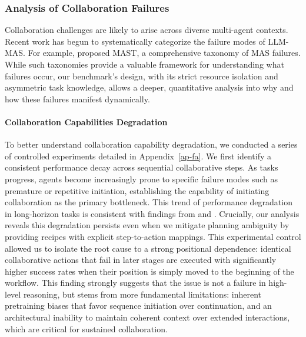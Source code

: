 \documentclass[11pt]{article}
\begin{document}
\subsubsection{Analysis of Collaboration Failures}
\label{fa}



Collaboration challenges are likely to arise across diverse multi-agent contexts. Recent work has begun to systematically categorize the failure modes of LLM-MAS. For example, \citet{cemri2025multi} proposed MAST, a comprehensive taxonomy of MAS failures. While such taxonomies provide a valuable framework for understanding what failures occur, our benchmark's design, with its strict resource isolation and asymmetric task knowledge, allows a deeper, quantitative analysis into why and how these failures manifest dynamically.



\paragraph{Collaboration Capabilities Degradation}

To better understand collaboration capability degradation, we conducted a series of controlled experiments detailed in Appendix~\ref{ap-fa}. We first identify a consistent performance decay across sequential collaborative steps. As tasks progress, agents become increasingly prone to specific failure modes such as premature or repetitive initiation, establishing the capability of initiating collaboration as the primary bottleneck. This trend of performance degradation in long-horizon tasks is consistent with findings from \citet{li2024measuring} and \citet{li2024autobencher}. Crucially, our analysis reveals this degradation persists even when we mitigate planning ambiguity by providing recipes with explicit step-to-action mappings. This experimental control allowed us to isolate the root cause to a strong positional dependence: identical collaborative actions that fail in later stages are executed with significantly higher success rates when their position is simply moved to the beginning of the workflow. This finding strongly suggests that the issue is not a failure in high-level reasoning, but stems from more fundamental limitations: inherent pretraining biases that favor sequence initiation over continuation, and an architectural inability to maintain coherent context over extended interactions, which are critical for sustained collaboration.
\end{document}
